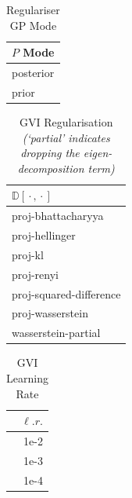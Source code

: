 \documentclass{article}
\newcommand{\wc}{\operatorname{{}\cdot{}}}
\numberwithin{equation}{section}
\begin{document}
\begin{table}[h!]
\tiny
\centering
\begin{tabular}{l}
\toprule
$P$ Mode \\
\midrule
                      posterior \\
                          prior \\
\bottomrule
\end{tabular}
\caption{Regulariser GP Mode}
\end{table}

\begin{table}[h!]
\tiny
\centering
\begin{tabular}{l}
\toprule
  $\mathbb{D}[\wc, \wc]$ \\
\midrule
            proj-bhattacharyya \\
                proj-hellinger \\
                       proj-kl \\
                    proj-renyi \\
proj-squared-difference \\
     proj-wasserstein \\
       wasserstein-partial \\
\bottomrule
\end{tabular}
\caption{GVI Regularisation \textit{(`partial' indicates dropping the eigen-decomposition term)}}
\end{table}

\begin{table}[h!]
\tiny
\centering
\begin{tabular}{r}
\toprule
 $\ell. r.$ \\
\midrule
                    1e-2 \\
                    1e-3 \\
                    1e-4 \\
\bottomrule
\end{tabular}
\caption{GVI Learning Rate}
\end{table}
\end{document}
